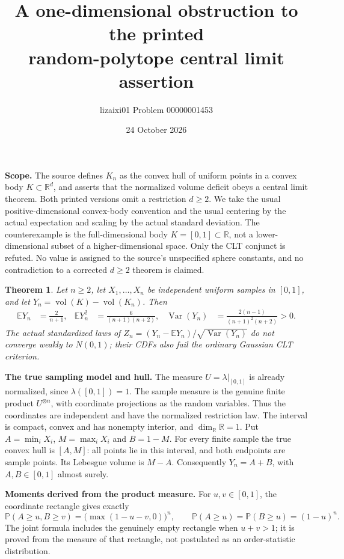 \documentclass[10pt,a4paper]{article}
\title{A one-dimensional obstruction to the printed\protect\\random-polytope central limit assertion}
\author{lizaixi01 \quad Problem 00000001453}
\date{24 October 2026}
\newcommand{\E}{\mathbb E}
\newcommand{\Var}{\operatorname{Var}}
\newcommand{\Pbb}{\mathbb P}
\newcommand{\R}{\mathbb R}
\newtheorem{theorem}{Theorem}
\begin{document}
\maketitle
\vspace{-7mm}

\textbf{Scope.} The source defines $K_n$ as the convex hull of uniform points in a
convex body $K\subset\R^d$, and asserts that the normalized volume deficit obeys a
central limit theorem. Both printed versions omit a restriction $d\ge2$.
We take the usual positive-dimensional convex-body convention and the usual
centering by the actual expectation and scaling by the actual standard deviation.
The counterexample is the full-dimensional body $K=[0,1]\subset\R$, not a
lower-dimensional subset of a higher-dimensional space. Only the CLT conjunct is
refuted. No value is assigned to the source's unspecified sphere constants, and
no contradiction to a corrected $d\ge2$ theorem is claimed.

\begin{theorem}
Let $n\ge2$, let $X_1,\ldots,X_n$ be independent uniform samples in $[0,1]$,
and let $Y_n=\operatorname{vol}(K)-\operatorname{vol}(K_n)$. Then
\begin{align*}
\E Y_n&=\frac2{n+1},&
\E Y_n^2&=\frac6{(n+1)(n+2)},&
\Var(Y_n)&=\frac{2(n-1)}{(n+1)^2(n+2)}>0.
\end{align*}
The actual standardized laws of
$Z_n=(Y_n-\E Y_n)/\sqrt{\Var(Y_n)}$ do not converge weakly to $N(0,1)$;
their CDFs also fail the ordinary Gaussian CLT criterion.
\end{theorem}

\textbf{The true sampling model and hull.}
The measure $U=\lambda|_{[0,1]}$ is already normalized, since
$\lambda([0,1])=1$. The sample measure is the genuine finite product $U^{\otimes n}$,
with coordinate projections as the random variables. Thus the coordinates are
independent and have the normalized restriction law. The interval is compact,
convex and has nonempty interior, and $\dim_\R\R=1$.
Put $A=\min_iX_i$, $M=\max_iX_i$ and $B=1-M$. For every finite sample the true
convex hull is $[A,M]$: all points lie in this interval, and both endpoints
are sample points. Its Lebesgue volume is $M-A$. Consequently
$Y_n=A+B$, with $A,B\in[0,1]$ almost surely.

\textbf{Moments derived from the product measure.}
For $u,v\in[0,1]$, the coordinate rectangle gives exactly
\[
 \Pbb(A\ge u,B\ge v)=\bigl(\max(1-u-v,0)\bigr)^n,
 \qquad
 \Pbb(A\ge u)=\Pbb(B\ge u)=(1-u)^n.
\]
The joint formula includes the genuinely empty rectangle when $u+v>1$;
it is proved from the measure of that rectangle, not postulated as an
order-statistic distribution.
\end{document}
